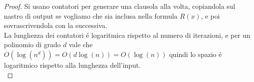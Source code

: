 \begin{proof}
Si usano contatori per generare una clausola alla volta, 
copiandola sul nastro di output se vogliamo che sia inclusa nella formula $R(x)$, 
e poi sovrascrivendola con la successiva.\\
La lunghezza dei contatori é logaritmica rispetto al numero di iterazioni,
e per un polinomio di grado $d$ vale che $O(\log(n^d)) = O(d \log(n)) = O(\log(n))$
quindi lo spazio é logaritmico rispetto alla lunghezza dell'input.\\
\end{proof}